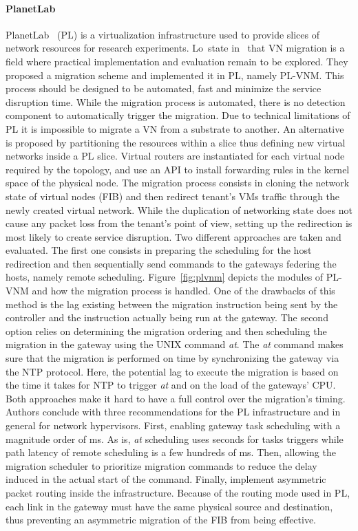 \paragraph{PlanetLab} PlanetLab~\cite{planetlab} (PL) is a virtualization infrastructure used to provide slices of network resources for research experiments. Lo~\etal state in~\cite{Lo2014} that VN migration is a field where practical implementation and evaluation remain to be explored. They proposed a migration scheme and implemented it in PL, namely PL-VNM. This process should be designed to be automated, fast and minimize the service disruption time. While the migration process is automated, there is no detection component to automatically trigger the migration. Due to technical limitations of PL it is impossible to migrate a VN from a substrate to another. An alternative is proposed by partitioning the resources within a slice thus defining new virtual networks inside a PL slice. Virtual routers are instantiated for each virtual node required by the topology, and use an API to install forwarding rules in the kernel space of the physical node. 
The migration process consists in cloning the network state of virtual nodes (\ie FIB) and then  redirect tenant's VMs traffic through the newly created virtual network.
While the duplication of networking state does not cause any packet loss from the tenant's point of view, setting up the redirection is most likely to create service disruption.
Two different approaches are taken and evaluated. The first one consists in preparing the scheduling for the host redirection and then sequentially send commands to the gateways federing the hosts, namely remote scheduling.
Figure~\ref{fig:plvnm} depicts the modules of PL-VNM and how the migration process is handled.
One of the drawbacks of this method is the lag existing between the migration instruction being sent by the controller and the instruction actually being run at the gateway.
The second option relies on determining the migration ordering and then scheduling the migration in the gateway using the UNIX command \textit{at}. The \textit{at} command makes sure that the migration is performed on time by synchronizing the gateway via the NTP protocol. Here, the potential lag to execute the migration is based on the time it takes for NTP to trigger \textit{at} and on the load of the gateways' CPU.
Both approaches make it hard to have a full control over the migration's timing.
Authors conclude with three recommendations for the PL infrastructure and in general for network hypervisors.
First, enabling gateway task scheduling with a magnitude order of ms. As is, \textit{at} scheduling uses seconds for tasks triggers while path latency of remote scheduling is a few hundreds of ms.
Then, allowing the migration scheduler to prioritize migration commands to reduce the delay induced in the actual start of the command.
Finally, implement asymmetric packet routing inside the infrastructure.
Because of the routing mode used in PL, each link in the gateway must have the same physical source and destination, thus preventing an asymmetric migration of the FIB from being effective. 

